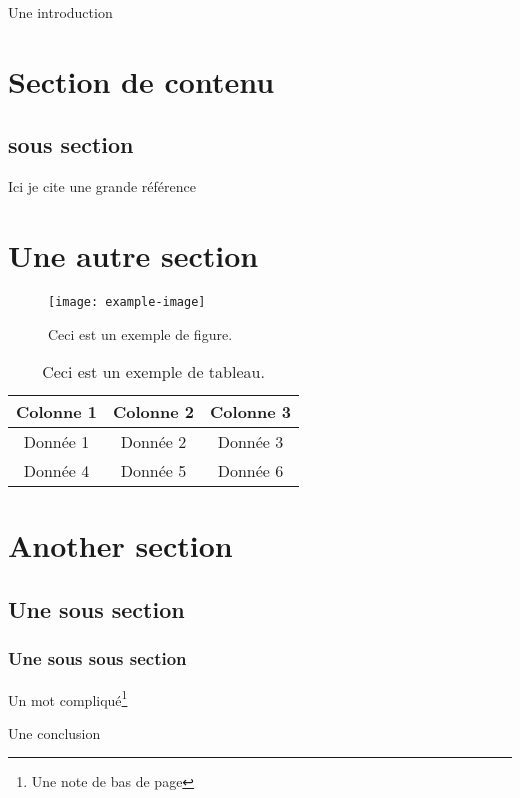 Une introduction

\newpage
\section{Section de contenu}
\subsection{sous section}
Ici je cite une grande référence \cite{test}

\section{Une autre section}
\begin{figure}[h]
    \centering
    \texttt{[image: example-image]} %
    \caption{Ceci est un exemple de figure.}
    \label{fig:example}
\end{figure}

\begin{table}[h]
    \centering
    \caption{Ceci est un exemple de tableau.}
    \begin{tabular}{|c|c|c|}
        \hline
        Colonne 1 & Colonne 2 & Colonne 3 \\ \hline
        Donnée 1  & Donnée 2  & Donnée 3  \\ \hline
        Donnée 4  & Donnée 5  & Donnée 6  \\ \hline
    \end{tabular}
    \label{tab:example}
\end{table}

\section{Another section}
\subsection{Une sous section}
\subsubsection{Une sous sous section}
Un mot compliqué\footnote{Une note de bas de page}

\newpage
{}
Une conclusion